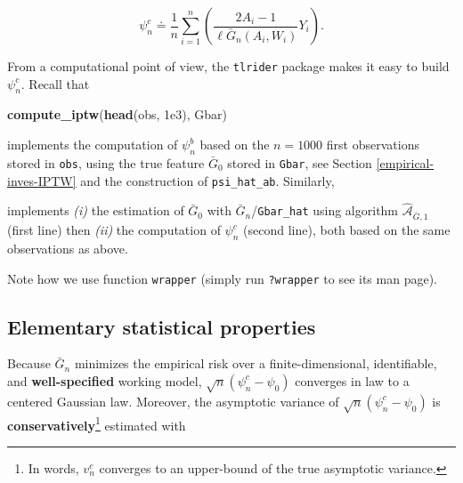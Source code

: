\documentclass[11pt,openright,twoside]{book}
\newenvironment{Shaded}{\begin{snugshade}}{\end{snugshade}}
\newcommand{\CommentTok}[1]{\textcolor[rgb]{0.56,0.35,0.01}{\textit{#1}}}
\newcommand{\FloatTok}[1]{\textcolor[rgb]{0.00,0.00,0.81}{#1}}
\newcommand{\KeywordTok}[1]{\textcolor[rgb]{0.13,0.29,0.53}{\textbf{#1}}}
\newcommand{\NormalTok}[1]{#1}
\newcommand{\OperatorTok}[1]{\textcolor[rgb]{0.81,0.36,0.00}{\textbf{#1}}}
\newcommand{\StringTok}[1]{\textcolor[rgb]{0.31,0.60,0.02}{#1}}
\newcommand{\Algo}{\widehat{\mathcal{A}}}
\newcommand{\defq}{\doteq}
\newcommand{\Gbar}{\bar{G}}
\theoremstyle{definition}
\theoremstyle{definition}
\theoremstyle{definition}
\theoremstyle{remark}
\begin{document}
\begin{equation*}
\psi_{n}^{c}   \defq   \frac{1}{n}    \sum_{i=1}^{n}   \left(\frac{2A_{i}   -
1}{\ell\Gbar_{n}(A_{i}, W_{i})} Y_{i}\right).
\end{equation*}

From a computational point of view, the \texttt{tlrider} package makes it easy to
build \(\psi_{n}^{c}\). Recall that

\begin{Shaded}
\begin{Highlighting}[]
\KeywordTok{compute_iptw}\NormalTok{(}\KeywordTok{head}\NormalTok{(obs, }\FloatTok{1e3}\NormalTok{), Gbar)}
\end{Highlighting}
\end{Shaded}

implements the computation of \(\psi_{n}^{b}\) based on the \(n=1000\) first
observations stored in \texttt{obs}, using the true feature \(\Gbar_{0}\) stored in
\texttt{Gbar}, see Section \ref{empirical-inves-IPTW} and the construction of
\texttt{psi\_hat\_ab}. Similarly,

\begin{Shaded}
\end{Shaded}

implements \emph{(i)} the estimation of \(\Gbar_{0}\) with \(\Gbar_{n}\)/\texttt{Gbar\_hat}
using algorithm \(\Algo_{\Gbar,1}\) (first line) then \emph{(ii)} the computation of
\(\psi_{n}^{c}\) (second line), both based on the same observations as above.

Note how we use function \texttt{wrapper} (simply run \texttt{?wrapper} to see its man
page).

\hypertarget{elementary-stat-prop-iptw}{%
\subsection{Elementary statistical properties}\label{elementary-stat-prop-iptw}}

Because \(\Gbar_{n}\) minimizes the empirical risk over a finite-dimensional,
identifiable, and \textbf{well-specified} working model, \(\sqrt{n} (\psi_{n}^{c} - \psi_{0})\) converges in law to a centered Gaussian law.
Moreover, the asymptotic variance of \(\sqrt{n} (\psi_{n}^{c} - \psi_{0})\) is
\textbf{conservatively}\footnote{In words, \(v_{n}^{c}\) converges to an upper-bound of the
  true asymptotic variance.} estimated
with
\end{document}
